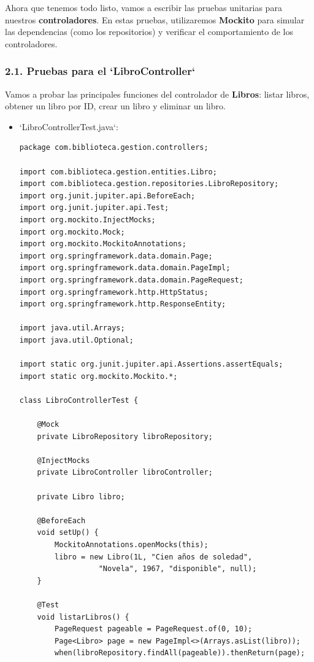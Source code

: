 \documentclass[11pt]{article}
\begin{document}
Ahora que tenemos todo listo, vamos a escribir las pruebas unitarias para nuestros \textbf{\textbf{controladores}}. En estas pruebas, utilizaremos \textbf{\textbf{Mockito}} para simular las dependencias (como los repositorios) y verificar el comportamiento de los controladores.

\subsubsection{2.1. Pruebas para el `LibroController`}
\label{sec:org6bd4eb3}

Vamos a probar las principales funciones del controlador de \textbf{\textbf{Libros}}: listar libros, obtener un libro por ID, crear un libro y eliminar un libro.

\begin{itemize}
\item `LibroControllerTest.java`:
\label{sec:org2aeb6e3}

\begin{verbatim}
package com.biblioteca.gestion.controllers;

import com.biblioteca.gestion.entities.Libro;
import com.biblioteca.gestion.repositories.LibroRepository;
import org.junit.jupiter.api.BeforeEach;
import org.junit.jupiter.api.Test;
import org.mockito.InjectMocks;
import org.mockito.Mock;
import org.mockito.MockitoAnnotations;
import org.springframework.data.domain.Page;
import org.springframework.data.domain.PageImpl;
import org.springframework.data.domain.PageRequest;
import org.springframework.http.HttpStatus;
import org.springframework.http.ResponseEntity;

import java.util.Arrays;
import java.util.Optional;

import static org.junit.jupiter.api.Assertions.assertEquals;
import static org.mockito.Mockito.*;

class LibroControllerTest {

    @Mock
    private LibroRepository libroRepository;

    @InjectMocks
    private LibroController libroController;

    private Libro libro;

    @BeforeEach
    void setUp() {
        MockitoAnnotations.openMocks(this);
        libro = new Libro(1L, "Cien años de soledad",
                  "Novela", 1967, "disponible", null);
    }

    @Test
    void listarLibros() {
        PageRequest pageable = PageRequest.of(0, 10);
        Page<Libro> page = new PageImpl<>(Arrays.asList(libro));
        when(libroRepository.findAll(pageable)).thenReturn(page);


\end{verbatim}
\end{itemize}
\end{document}
